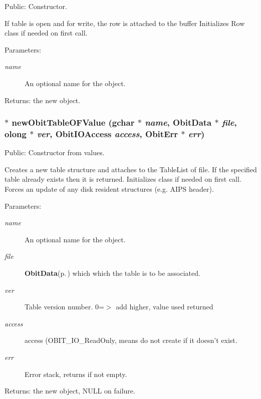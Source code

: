Public: Constructor. 

If table is open and for write, the row is attached to the buffer Initializes Row class if needed on first call. \begin{Desc}
\item[Parameters:]
\begin{description}
\item[{\em name}]An optional name for the object. \end{description}
\end{Desc}
\begin{Desc}
\item[Returns:]the new object. \end{Desc}
\subsubsection{$\ast$ new\-Obit\-Table\-OFValue (gchar $\ast$ {\em name}, {\bf Obit\-Data} $\ast$ {\em file}, {\bf olong} $\ast$ {\em ver}, Obit\-IOAccess {\em access}, {\bf Obit\-Err} $\ast$ {\em err})}\label{ObitTableOF_8h_a12}


Public: Constructor from values. 

Creates a new table structure and attaches to the Table\-List of file. If the specified table already exists then it is returned. Initializes class if needed on first call. Forces an update of any disk resident structures (e.g. AIPS header). \begin{Desc}
\item[Parameters:]
\begin{description}
\item[{\em name}]An optional name for the object. \item[{\em file}]{\bf Obit\-Data}{\rm (p.\,\pageref{structObitData})} which which the table is to be associated. \item[{\em ver}]Table version number. 0=$>$ add higher, value used returned \item[{\em access}]access (OBIT\_\-IO\_\-Read\-Only, means do not create if it doesn't exist. \item[{\em err}]Error stack, returns if not empty. \end{description}
\end{Desc}
\begin{Desc}
\item[Returns:]the new object, NULL on failure. \end{Desc}
